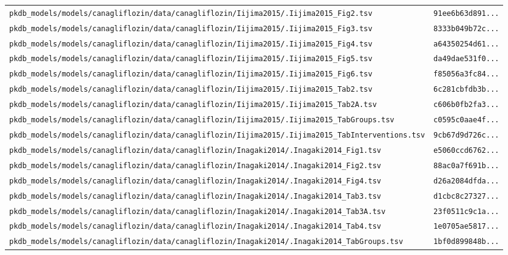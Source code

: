 \begin{longtable}{ll}
\texttt{pkdb\_models/models/canagliflozin/data/canagliflozin/Iijima2015/.Iijima2015\_Fig2.tsv} & \texttt{91ee6b63d891...} \\
\texttt{pkdb\_models/models/canagliflozin/data/canagliflozin/Iijima2015/.Iijima2015\_Fig3.tsv} & \texttt{8333b049b72c...} \\
\texttt{pkdb\_models/models/canagliflozin/data/canagliflozin/Iijima2015/.Iijima2015\_Fig4.tsv} & \texttt{a64350254d61...} \\
\texttt{pkdb\_models/models/canagliflozin/data/canagliflozin/Iijima2015/.Iijima2015\_Fig5.tsv} & \texttt{da49dae531f0...} \\
\texttt{pkdb\_models/models/canagliflozin/data/canagliflozin/Iijima2015/.Iijima2015\_Fig6.tsv} & \texttt{f85056a3fc84...} \\
\texttt{pkdb\_models/models/canagliflozin/data/canagliflozin/Iijima2015/.Iijima2015\_Tab2.tsv} & \texttt{6c281cbfdb3b...} \\
\texttt{pkdb\_models/models/canagliflozin/data/canagliflozin/Iijima2015/.Iijima2015\_Tab2A.tsv} & \texttt{c606b0fb2fa3...} \\
\texttt{pkdb\_models/models/canagliflozin/data/canagliflozin/Iijima2015/.Iijima2015\_TabGroups.tsv} & \texttt{c0595c0aae4f...} \\
\texttt{pkdb\_models/models/canagliflozin/data/canagliflozin/Iijima2015/.Iijima2015\_TabInterventions.tsv} & \texttt{9cb67d9d726c...} \\
\texttt{pkdb\_models/models/canagliflozin/data/canagliflozin/Inagaki2014/.Inagaki2014\_Fig1.tsv} & \texttt{e5060ccd6762...} \\
\texttt{pkdb\_models/models/canagliflozin/data/canagliflozin/Inagaki2014/.Inagaki2014\_Fig2.tsv} & \texttt{88ac0a7f691b...} \\
\texttt{pkdb\_models/models/canagliflozin/data/canagliflozin/Inagaki2014/.Inagaki2014\_Fig4.tsv} & \texttt{d26a2084dfda...} \\
\texttt{pkdb\_models/models/canagliflozin/data/canagliflozin/Inagaki2014/.Inagaki2014\_Tab3.tsv} & \texttt{d1cbc8c27327...} \\
\texttt{pkdb\_models/models/canagliflozin/data/canagliflozin/Inagaki2014/.Inagaki2014\_Tab3A.tsv} & \texttt{23f0511c9c1a...} \\
\texttt{pkdb\_models/models/canagliflozin/data/canagliflozin/Inagaki2014/.Inagaki2014\_Tab4.tsv} & \texttt{1e0705ae5817...} \\
\texttt{pkdb\_models/models/canagliflozin/data/canagliflozin/Inagaki2014/.Inagaki2014\_TabGroups.tsv} & \texttt{1bf0d899848b...} \\

\end{longtable}
